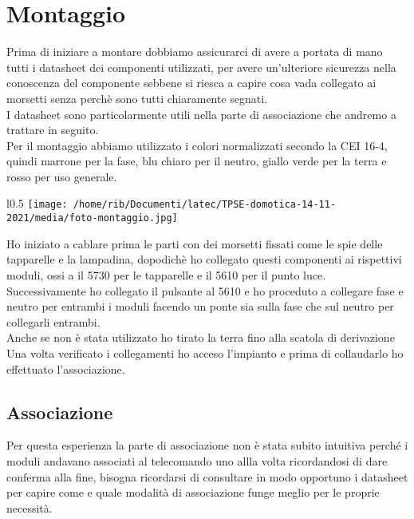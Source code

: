 \documentclass[12pt]{article}
\begin{document}
\section{Montaggio}
Prima di iniziare a montare dobbiamo assicurarci di avere a portata di mano tutti i datasheet dei componenti 
utilizzati, per avere un'ulteriore sicurezza nella conoscenza del componente sebbene si riesca a capire cosa vada
collegato ai morsetti senza perchè sono tutti chiaramente segnati.\\
I datasheet sono particolarmente utili nella parte di associazione che andremo a trattare in seguito.\\
Per il montaggio abbiamo utilizzato i colori normalizzati secondo la CEI 16-4, quindi marrone per la fase, blu chiaro
per il neutro, giallo verde per la terra e rosso per uso generale.\\
\begin{wrapfigure}{l}{0.5\textwidth}
    \centering
    \texttt{[image: /home/rib/Documenti/latec/TPSE-domotica-14-11-2021/media/foto-montaggio.jpg]}
    \end{wrapfigure}
Ho iniziato a cablare prima le parti con dei morsetti fissati come le spie delle tapparelle e la lampadina, dopodichè 
ho collegato questi componenti ai rispettivi moduli, ossi a il 5730 per le tapparelle e il 5610 per il punto luce.\\
Successivamente ho collegato il pulsante al 5610 e ho proceduto a collegare fase e neutro per entrambi i moduli facendo un ponte
sia sulla fase che sul neutro per collegarli entrambi.\\
Anche se non è stata utilizzato ho tirato la terra fino alla scatola di derivazione\\
Una volta verificato i collegamenti ho acceso l'impianto e prima di collaudarlo ho effettuato l'associazione.\\
    
    
    
    \clearpage

    \subsection{Associazione}
    Per questa esperienza la parte di associazione non è stata subito intuitiva perché i moduli andavano associati al 
    telecomando uno allla volta ricordandosi di dare conferma alla fine, bisogna ricordarsi di consultare in modo 
    opportuno i datasheet per capire come e quale modalità di associazione funge meglio per le proprie necessità.\\
\end{document}
